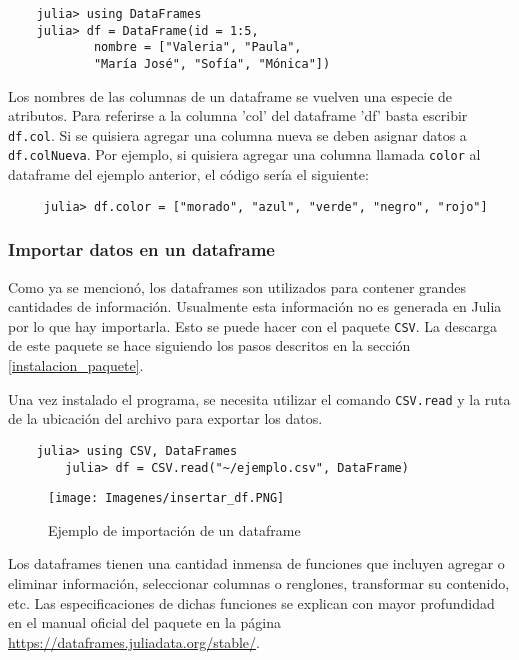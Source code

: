 \begin{verbatim}
	julia> using DataFrames
	julia> df = DataFrame(id = 1:5, 
   			nombre = ["Valeria", "Paula", 
   			"María José", "Sofía", "Mónica"])
\end{verbatim}

Los nombres de las columnas de un dataframe se vuelven una especie de atributos. Para referirse a la columna 'col' del dataframe 'df' basta escribir \texttt{df.col}. Si se quisiera agregar una columna nueva se deben asignar datos a \texttt{df.colNueva}. Por ejemplo, si quisiera agregar una columna llamada \texttt{color} al dataframe del ejemplo anterior, el código sería el siguiente: 

\begin{verbatim}
     julia> df.color = ["morado", "azul", "verde", "negro", "rojo"]
\end{verbatim}

\subsubsection{Importar datos en un dataframe}

Como ya se mencionó, los dataframes son utilizados para contener grandes cantidades de información. Usualmente esta información no es generada en \textsf{Julia} por lo que hay importarla. Esto se puede hacer con el paquete \texttt{CSV}. La descarga de este paquete se hace siguiendo  los pasos descritos en la sección \ref{instalacion_paquete}. 

Una vez instalado el programa, se necesita utilizar el comando \texttt{CSV.read} y la ruta de la ubicación del archivo para exportar los datos. 

\begin{verbatim}
	julia> using CSV, DataFrames
        julia> df = CSV.read("~/ejemplo.csv", DataFrame)
\end{verbatim}

\begin{figure}[h]
\begin{center}
\texttt{[image: Imagenes/insertar\_df.PNG]}
	\caption{Ejemplo de importación de un dataframe}
  \label{insertar_df}
\end{center}
\end{figure}

Los dataframes tienen una cantidad inmensa de funciones que incluyen agregar o eliminar información, seleccionar columnas o renglones, transformar su contenido, etc. Las especificaciones de dichas funciones se explican con mayor profundidad en el manual oficial del paquete en la página \url{https://dataframes.juliadata.org/stable/}. 


